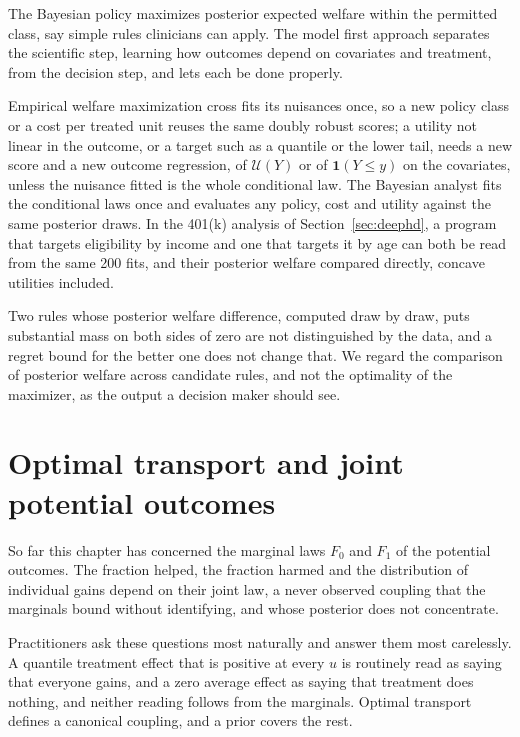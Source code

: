 The Bayesian policy maximizes posterior expected welfare within the permitted class, say simple rules clinicians can apply. The model first approach separates the scientific step, learning how outcomes depend on covariates and treatment, from the decision step, and lets each be done properly.

Empirical welfare maximization cross fits its nuisances once, so a new policy class or a cost per treated unit reuses the same doubly robust scores; a utility not linear in the outcome, or a target such as a quantile or the lower tail, needs a new score and a new outcome regression, of $\mathcal{U}(Y)$ or of $\mathbf{1}(Y \leq y)$ on the covariates, unless the nuisance fitted is the whole conditional law. The Bayesian analyst fits the conditional laws once and evaluates any policy, cost and utility against the same posterior draws. In the 401(k) analysis of Section~\ref{sec:deephd}, a program that targets eligibility by income and one that targets it by age can both be read from the same 200 fits, and their posterior welfare compared directly, concave utilities included.

Two rules whose posterior welfare difference, computed draw by draw, puts substantial mass on both sides of zero are not distinguished by the data, and a regret bound for the better one does not change that. We regard the comparison of posterior welfare across candidate rules, and not the optimality of the maximizer, as the output a decision maker should see.

\section{Optimal transport and joint potential outcomes}\label{sec:ot}

So far this chapter has concerned the marginal laws $F_0$ and $F_1$ of the potential outcomes. The fraction helped, the fraction harmed and the distribution of individual gains depend on their joint law, a never observed coupling that the marginals bound without identifying, and whose posterior does not concentrate.

Practitioners ask these questions most naturally and answer them most carelessly. A quantile treatment effect that is positive at every $u$ is routinely read as saying that everyone gains, and a zero average effect as saying that treatment does nothing, and neither reading follows from the marginals. Optimal transport defines a canonical coupling, and a prior covers the rest.

